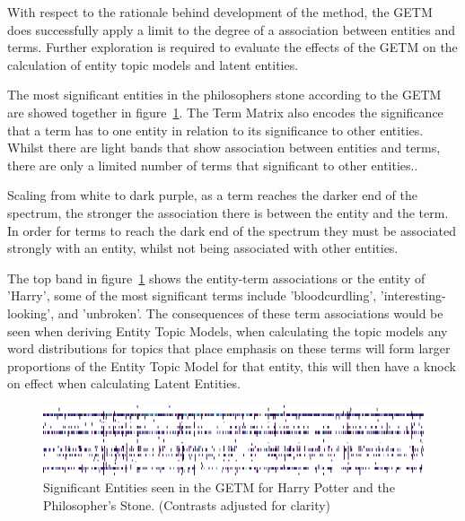 \documentclass[10pt]{report}
\begin{document}
With respect to the rationale behind development of the method, the GETM does successfully apply a limit to the degree of a association between entities and terms. Further exploration is required to evaluate the effects of the GETM on the calculation of entity topic models and latent entities.

The most significant entities in the philosophers stone according to the GETM are showed together in figure~\ref{fig:hp_full_ps_sig_getm}. The Term Matrix also encodes the significance that a term has to one entity in relation to its significance to other entities. Whilst there are light bands that show association between entities and terms, there are only a limited number of terms that significant to other entities..

Scaling from white to dark purple, as a term reaches the darker end of the spectrum, the stronger the association there is between the entity and the term. In order for terms to reach the dark end of the spectrum they must be associated strongly with an entity, whilst not being associated with other entities.

The top band in figure~\ref{fig:hp_full_ps_sig_getm} shows the entity-term associations or the entity of 'Harry', some of the most significant terms include 'bloodcurdling', 'interesting-looking', and 'unbroken'.  The consequences of these term associations would be seen when deriving Entity Topic Models, when calculating the topic models any word distributions for topics that place emphasis on these terms will form larger proportions of the Entity Topic Model for that entity, this will then have a knock on effect when calculating Latent Entities. 

\begin{figure}[h!]
  \centering
  \includegraphics[scale=0.9]{phil_stone_significant_getm_intert}
  \caption{Significant Entities seen in the GETM for Harry Potter and the Philosopher's Stone. (Contrasts adjusted for clarity)\label{fig:hp_full_ps_sig_getm}} 
\end{figure}

\clearpage
\renewcommand{\baselinestretch}{1.0}\normalsize
\renewcommand{\arraystretch}{1.0}
\end{document}
